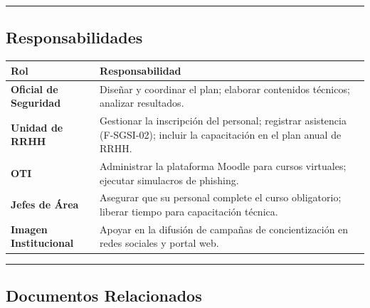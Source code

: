 \documentclass[10pt,letterpaper]{article}
\begin{document}
\begin{center}\rule{0.5\linewidth}{0.5pt}\end{center}

\subsection{Responsabilidades}\label{responsabilidades}

{\setlength{\RaggedRightRightskip}{0pt plus 5em}\small\sloppy \begin{longtable}[]{@{}
  >{\hspace{0pt}\RaggedRight\arraybackslash}p{}
  >{\hspace{0pt}\RaggedRight\arraybackslash}p{}@{}}
\toprule\noalign{}
\begin{minipage}[b]{\linewidth}\raggedright
Rol
\end{minipage} & \begin{minipage}[b]{\linewidth}\raggedright
Responsabilidad
\end{minipage} \\
\midrule\noalign{}
\endhead
\bottomrule\noalign{}
\endlastfoot
\textbf{Oficial de Seguridad} & Diseñar y coordinar el plan; elaborar
contenidos técnicos; analizar resultados. \\
\textbf{Unidad de RRHH} & Gestionar la inscripción del personal;
registrar asistencia (F-SGSI-02); incluir la capacitación en el plan
anual de RRHH. \\
\textbf{OTI} & Administrar la plataforma Moodle para cursos virtuales;
ejecutar simulacros de phishing. \\
\textbf{Jefes de Área} & Asegurar que su personal complete el curso
obligatorio; liberar tiempo para capacitación técnica. \\
\textbf{Imagen Institucional} & Apoyar en la difusión de campañas de
concientización en redes sociales y portal web. \\
\end{longtable}\normalsize}

\begin{center}\rule{0.5\linewidth}{0.5pt}\end{center}

\subsection{Documentos Relacionados}\label{documentos-relacionados}
\end{document}

